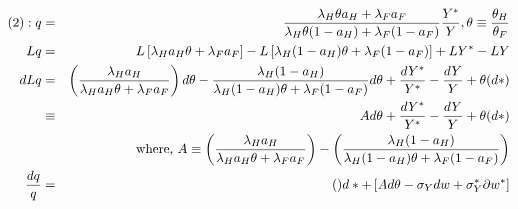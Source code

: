 \documentclass[]{article}
\begin{document}
\begin{eqnarray}
(2): q &=& \frac{\lambda_H \theta a_H+\lambda_F a_F}{\lambda_H \theta (1-a_H) + \lambda_F (1-a_F)} \frac{Y^*}{Y}, \theta \equiv \frac{\theta_H}{\theta_F}\notag\\
Lq &=& L\left[\lambda_H a_H \theta + \lambda_F a_F\right] - L\left[\lambda_H (1-a_H) \theta + \lambda_F (1-a_F)\right] + LY^*- LY\notag\\
dLq &=& \left(\frac{\lambda_H a_H}{\lambda_H a_H \theta + \lambda_F a_F}\right)d\theta - \frac{\lambda_H(1-a_H)}{\lambda_H(1-a_H)\theta + \lambda_F (1-a_F)}d\theta + \frac{dY^*}{Y^*} - \frac{dY}{Y} + \theta(d*)\notag\\
&\equiv & Ad\theta + \frac{dY^*}{Y^*}-\frac{dY}{Y} +\theta (d*)\notag\\
&& \mbox{where, } A\equiv \left(\frac{\lambda_H a_H}{\lambda_H a_H \theta + \lambda_F a_F}\right) - \left(\frac{\lambda_H (1-a_H)}{\lambda_H (1-a_H) \theta + \lambda_F (1-a_F)}\right)\notag\\
\frac{dq}{q} &=& ()d* + \left[ Ad\theta - \sigma_Y dw + \sigma_Y^* \partial w^* \right]
\end{eqnarray}
\end{document}
